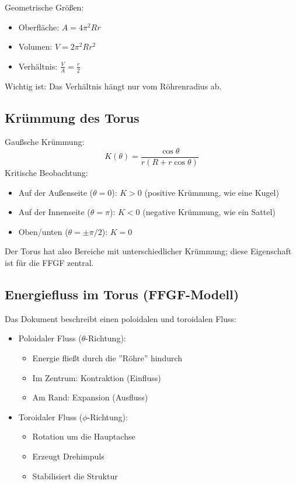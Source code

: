 	Geometrische Größen:
	\begin{itemize}
		\item Oberfläche: \( A = 4\pi^2 R r \)
		\item Volumen: \( V = 2\pi^2 R r^2 \)
		\item Verhältnis: \( \frac{V}{A} = \frac{r}{2} \)
	\end{itemize}
	Wichtig ist: Das Verhältnis hängt nur vom Röhrenradius ab.
	
	\subsection{Krümmung des Torus}
	Gaußsche Krümmung:
	\[
	K(\theta) = \frac{\cos \theta}{r(R + r \cos \theta)}
	\]
	Kritische Beobachtung:
	\begin{itemize}
		\item Auf der Außenseite (\( \theta = 0 \)): \( K > 0 \) (positive Krümmung, wie eine Kugel)
		\item Auf der Innenseite (\( \theta = \pi \)): \( K < 0 \) (negative Krümmung, wie ein Sattel)
		\item Oben/unten (\( \theta = \pm\pi/2 \)): \( K = 0 \)
	\end{itemize}
	Der Torus hat also Bereiche mit unterschiedlicher Krümmung; diese Eigenschaft ist für die FFGF zentral.
	
	\subsection{Energiefluss im Torus (FFGF-Modell)}
	Das Dokument beschreibt einen poloidalen und toroidalen Fluss:
	\begin{itemize}
		\item Poloidaler Fluss (\( \theta \)-Richtung):
		\begin{itemize}
			\item Energie fließt durch die ''Röhre'' hindurch
			\item Im Zentrum: Kontraktion (Einfluss)
			\item Am Rand: Expansion (Ausfluss)
		\end{itemize}
		\item Toroidaler Fluss (\( \phi \)-Richtung):
		\begin{itemize}
			\item Rotation um die Hauptachse
			\item Erzeugt Drehimpuls
			\item Stabilisiert die Struktur
		\end{itemize}
	\end{itemize}
	
